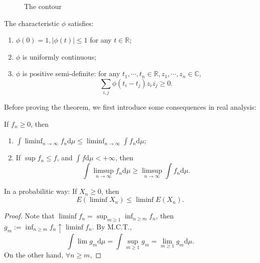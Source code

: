 \documentclass[11pt,singlecolumn, openany, citestyle=authoryear]{elegantbook}
\begin{document}
\begin{CJK}{UTF8}{gbsn}
\begin{figure}[h]
    \caption{The contour}
\end{figure}
\begin{theorem}\label{thm:thm2}
    The characteristic $\phi$ satisfies:
    \begin{enumerate}
        \item $\phi(0)=1, |\phi(t)|\leqslant 1$ for any $t\in\mathbb{R}$;
        \item $\phi$ is uniformly continuous;
        \item $\phi$ is positive semi-definite: for any $t_1,\cdots,t_n \in
        \mathbb{R}, z_1,\cdots,z_n\in\mathbb{C}$, 
        $$
        \sum_{i,j} \phi(t_i-t_j)z_i \overline{z_j}\geqslant 0.
        $$
    \end{enumerate}
\end{theorem}
Before proving the theorem, we first introduce some consequences in real analysis:
\begin{lemma}[Fatou]
    If $f_n\geqslant 0$, then 
    \begin{enumerate}
        \item $\displaystyle \int \liminf_{n\to\infty}f_n \mathrm{d}\mu \leqslant 
        \liminf_{n\to\infty} \int f_n\mathrm{d}\mu$;
        \item If $\sup f_n\leqslant f$, and $\displaystyle \int f\mathrm{d}\mu<+\infty$, then 
        $$
        \int \limsup_{n\to\infty}f_n\mathrm{d}\mu \geqslant \limsup_{n\to\infty} \int f_n\mathrm{d}\mu.
        $$
    \end{enumerate}
\end{lemma}
\begin{remark}
    In a probabilitic way: If $X_n\geqslant 0$, then 
    $$E(\liminf X_n)\leqslant \liminf E(X_n).$$
\end{remark}
\begin{proof}
    Note that $\liminf f_n = \sup_{m\geqslant 1}\inf_{n\geqslant m}f_n$, then 
    $g_m := \inf_{n\geqslant m}f_n \uparrow \liminf f_n$. By M.C.T., 
    $$
    \int \lim g_m \mathrm{d}\mu =
    \int \sup_{m\geqslant 1}g_m = \lim_{m\geqslant 1}g_m \mathrm{d}\mu.
    $$
    On the other hand, $\forall n\geqslant m$,

\end{proof}
\end{CJK}
\end{document}

